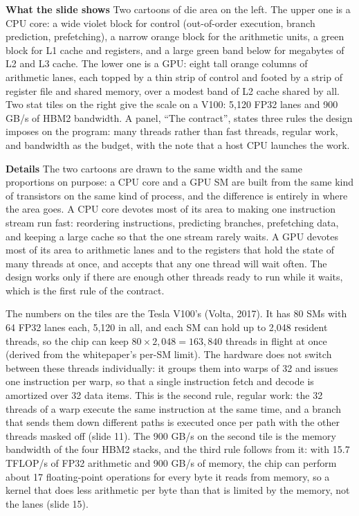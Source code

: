 \documentclass[11pt,letterpaper]{article}
\newcommand{\para}[1]{\medskip\noindent\textbf{#1}\quad}
\begin{document}
\para{What the slide shows} Two cartoons of die area on the left. The upper one is a CPU core: a wide violet block for control (out-of-order execution, branch prediction, prefetching), a narrow orange block for the arithmetic units, a green block for L1 cache and registers, and a large green band below for megabytes of L2 and L3 cache. The lower one is a GPU: eight tall orange columns of arithmetic lanes, each topped by a thin strip of control and footed by a strip of register file and shared memory, over a modest band of L2 cache shared by all. Two stat tiles on the right give the scale on a V100: 5{,}120 FP32 lanes and 900 GB/s of HBM2 bandwidth. A panel, ``The contract'', states three rules the design imposes on the program: many threads rather than fast threads, regular work, and bandwidth as the budget, with the note that a host CPU launches the work.

\para{Details} The two cartoons are drawn to the same width and the same proportions on purpose: a CPU core and a GPU SM are built from the same kind of transistors on the same kind of process, and the difference is entirely in where the area goes. A CPU core devotes most of its area to making one instruction stream run fast: reordering instructions, predicting branches, prefetching data, and keeping a large cache so that the one stream rarely waits. A GPU devotes most of its area to arithmetic lanes and to the registers that hold the state of many threads at once, and accepts that any one thread will wait often. The design works only if there are enough other threads ready to run while it waits, which is the first rule of the contract.

The numbers on the tiles are the Tesla V100's (Volta, 2017). It has 80 SMs with 64 FP32 lanes each, 5{,}120 in all, and each SM can hold up to 2{,}048 resident threads, so the chip can keep $80 \times 2{,}048 = 163{,}840$ threads in flight at once (derived from the whitepaper's per-SM limit). The hardware does not switch between these threads individually: it groups them into warps of 32 and issues one instruction per warp, so that a single instruction fetch and decode is amortized over 32 data items. This is the second rule, regular work: the 32 threads of a warp execute the same instruction at the same time, and a branch that sends them down different paths is executed once per path with the other threads masked off (slide 11). The 900 GB/s on the second tile is the memory bandwidth of the four HBM2 stacks, and the third rule follows from it: with 15.7 TFLOP/s of FP32 arithmetic and 900 GB/s of memory, the chip can perform about 17 floating-point operations for every byte it reads from memory, so a kernel that does less arithmetic per byte than that is limited by the memory, not the lanes (slide 15).
\end{document}
